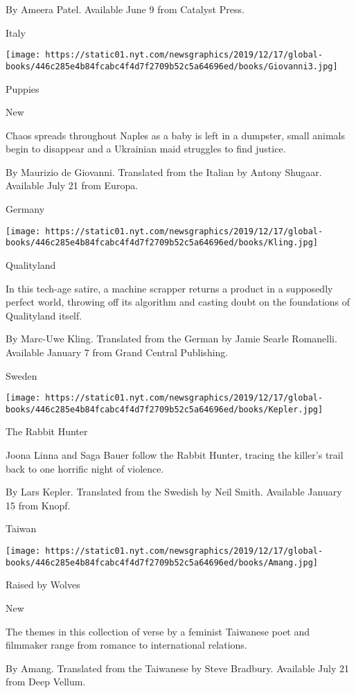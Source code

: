  By Ameera Patel. Available June 9 from Catalyst Press.

Italy

\texttt{[image: https://static01.nyt.com/newsgraphics/2019/12/17/global-books/446c285e4b84fcabc4f4d7f2709b52c5a64696ed/books/Giovanni3.jpg]}

Puppies

New

Chaos spreads throughout Naples as a baby is left in a dumpster, small
animals begin to disappear and a Ukrainian maid struggles to find
justice.

 By Maurizio de Giovanni. Translated from the Italian by Antony Shugaar.
Available July 21 from Europa.

Germany

\texttt{[image: https://static01.nyt.com/newsgraphics/2019/12/17/global-books/446c285e4b84fcabc4f4d7f2709b52c5a64696ed/books/Kling.jpg]}

Qualityland

In this tech-age satire, a machine scrapper returns a product in a
supposedly perfect world, throwing off its algorithm and casting doubt
on the foundations of Qualityland itself.

 By Marc-Uwe Kling. Translated from the German by Jamie Searle
Romanelli. Available January 7 from Grand Central Publishing.

Sweden

\texttt{[image: https://static01.nyt.com/newsgraphics/2019/12/17/global-books/446c285e4b84fcabc4f4d7f2709b52c5a64696ed/books/Kepler.jpg]}

The Rabbit Hunter

Joona Linna and Saga Bauer follow the Rabbit Hunter, tracing the
killer's trail back to one horrific night of violence.

 By Lars Kepler. Translated from the Swedish by Neil Smith. Available
January 15 from Knopf.

Taiwan

\texttt{[image: https://static01.nyt.com/newsgraphics/2019/12/17/global-books/446c285e4b84fcabc4f4d7f2709b52c5a64696ed/books/Amang.jpg]}

Raised by Wolves

New

The themes in this collection of verse by a feminist Taiwanese poet and
filmmaker range from romance to international relations.

 By Amang. Translated from the Taiwanese by Steve Bradbury. Available
July 21 from Deep Vellum.

